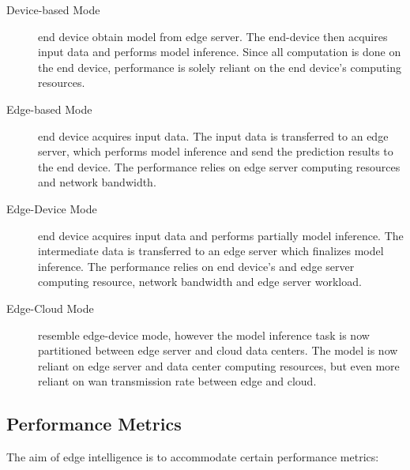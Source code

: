 \begin{description}
	\item[Device-based Mode] end device obtain model from edge server. The end-device then acquires input data and performs model inference. Since all computation is done on the end device, performance is solely reliant on the end device's computing resources.  
	\item[Edge-based Mode] end device acquires input data. The input data is transferred to an edge server, which performs model inference and send the prediction results to the end device. The performance relies on edge server computing resources and network bandwidth.
	\item[Edge-Device Mode] end device acquires input data and performs partially model inference. The intermediate data is transferred to an edge server which finalizes model inference. The performance relies on end device's and edge server computing resource, network bandwidth and edge server workload. 
	\item[Edge-Cloud Mode] resemble edge-device mode, however the model inference task is now partitioned between edge server and cloud data centers. The model is now reliant on edge server and data center computing resources, but even more reliant on \gls{wan} transmission rate between edge and cloud. 
\end{description}

\subsection{Performance Metrics}

The aim of edge intelligence is to accommodate certain performance metrics:

